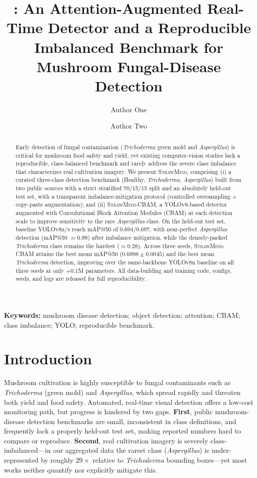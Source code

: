\documentclass[11pt]{article}
\title{\sm: An Attention-Augmented Real-Time Detector and a Reproducible Imbalanced Benchmark for Mushroom Fungal-Disease Detection}
\author[1]{Author One}
\author[1]{Author Two}
\affil[1]{Affiliation, City, Country. \texttt{\{a1,a2\}@inst.edu}}
\date{}
\newcommand{\sm}{\textsc{StrawMind}}
\newcommand{\smc}{\textsc{StrawMind-CBAM}}
\begin{document}
\maketitle

\begin{abstract}
Early detection of fungal contamination (\emph{Trichoderma} green mold and \emph{Aspergillus})
is critical for mushroom food safety and yield, yet existing computer-vision studies lack a
reproducible, class-balanced benchmark and rarely address the severe class imbalance that
characterizes real cultivation imagery. We present \sm, comprising (i) a curated three-class
detection benchmark (Healthy, \emph{Trichoderma}, \emph{Aspergillus}) built from two public
sources with a strict stratified 70/15/15 split and an absolutely held-out test set, with a
transparent imbalance-mitigation protocol (controlled oversampling + copy-paste augmentation);
and (ii) \smc, a YOLOv8-based detector augmented with Convolutional Block Attention Modules
(CBAM) at each detection scale to improve sensitivity to the rare \emph{Aspergillus} class.
On the held-out test set, baseline YOLOv8n/s reach mAP@50 of $0.694/0.697$, with near-perfect
\emph{Aspergillus} detection (mAP@50 $\approx 0.99$) after imbalance mitigation, while the
densely-packed \emph{Trichoderma} class remains the hardest ($\approx 0.28$). Across three seeds, \smc{} attains the best mean mAP@50 ($0.6998\pm0.0045$) and the best mean
\emph{Trichoderma} detection, improving over the same-backbone YOLOv8n baseline on all three seeds
at only $+0.1$M parameters. All data-building and training code, configs,
seeds, and logs are released for full reproducibility.
\end{abstract}

\textbf{Keywords:} mushroom disease detection; object detection; attention; CBAM; class imbalance; YOLO; reproducible benchmark.

\section{Introduction}
Mushroom cultivation is highly susceptible to fungal contaminants such as \emph{Trichoderma}
(green mold) and \emph{Aspergillus}, which spread rapidly and threaten both yield and food safety.
Automated, real-time visual detection offers a low-cost monitoring path, but progress is hindered
by two gaps. \textbf{First}, public mushroom-disease detection benchmarks are small, inconsistent
in class definitions, and frequently lack a properly held-out test set, making reported numbers
hard to compare or reproduce. \textbf{Second}, real cultivation imagery is severely
class-imbalanced---in our aggregated data the rarest class (\emph{Aspergillus}) is under-represented
by roughly $29\times$ relative to \emph{Trichoderma} bounding boxes---yet most works neither quantify
nor explicitly mitigate this.
\end{document}
